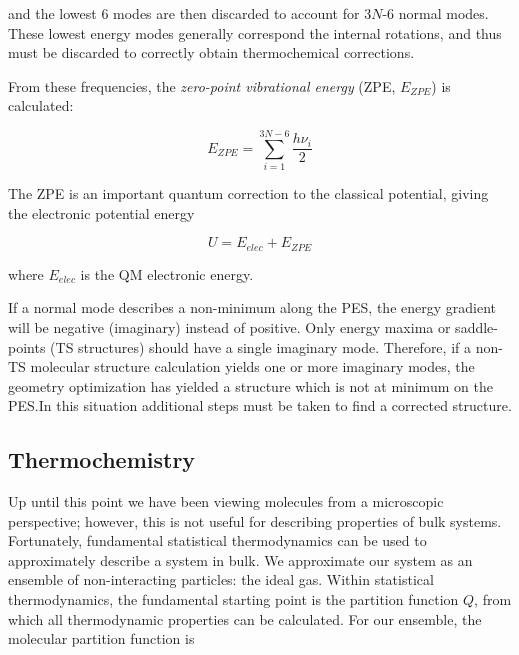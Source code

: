 \noindent and the lowest 6 modes are then discarded to account for 3$N$-6 normal modes. These lowest energy modes generally correspond the internal rotations, and thus must be discarded to correctly obtain thermochemical corrections.

From these frequencies, the \emph{zero-point vibrational energy} (ZPE, $E_{ZPE}$) is calculated:

\begin{equation}
  E_{ZPE} = \sum_{i=1}^{3N-6} \frac{h\nu_i}{2}
\end{equation}

\noindent The ZPE is an important quantum correction to the classical potential, giving the electronic potential energy

\begin{equation}
U = E_{elec} + E_{ZPE}
\end{equation}

\noindent where $E_{elec}$ is the QM electronic energy.

If a normal mode describes a non-minimum along the PES, the energy gradient will be negative (imaginary) instead of positive. Only energy maxima or saddle-points (TS structures) should have a single imaginary mode. Therefore, if a non-TS molecular structure calculation yields one or more imaginary modes, the geometry optimization has yielded a structure which is not at minimum on the PES.\@ In this situation additional steps must be taken to find a corrected structure.

\subsection{Thermochemistry}

Up until this point we have been viewing molecules from a microscopic perspective; however, this is not useful for describing properties of bulk systems. Fortunately, fundamental statistical thermodynamics can be used to approximately describe a system in bulk.\cite{McQuarrie1999,McQuarrie2000} We approximate our system as an ensemble of non-interacting particles: the ideal gas. Within statistical thermodynamics, the fundamental starting point is the partition function $Q$, from which all thermodynamic properties can be calculated. For our ensemble, the molecular partition function is

